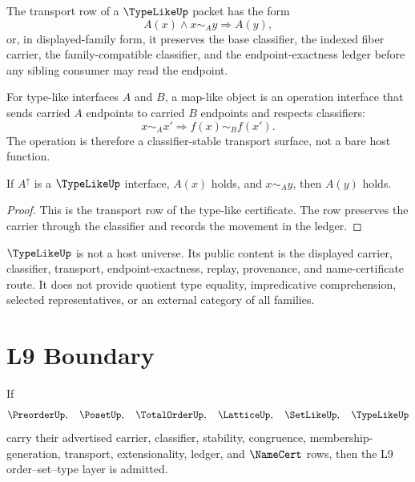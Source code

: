 \begin{definition}
\label{def:order-set-type-typelike-transport}
The transport row of a $\TypeLikeUp$ packet has the form
$$
A(x)\wedge x\sim_A y\Longrightarrow A(y),
$$
or, in displayed-family form, it preserves the base classifier, the indexed
fiber carrier, the family-compatible classifier, and the endpoint-exactness
ledger before any sibling consumer may read the endpoint.
\end{definition}

\begin{definition}
\label{def:order-set-type-maplike}
For type-like interfaces $A$ and $B$, a map-like object is an operation
interface that sends carried $A$ endpoints to carried $B$ endpoints and
respects classifiers:
$$
x\sim_A x'\Longrightarrow f(x)\sim_B f(x').
$$
The operation is therefore a classifier-stable transport surface, not a bare
host function.
\end{definition}

\begin{theorem}
\label{thm:order-set-type-transport-core}
If $A^\uparrow$ is a $\TypeLikeUp$ interface, $A(x)$ holds, and
$x\sim_A y$, then $A(y)$ holds.
\end{theorem}

\begin{proof}
This is the transport row of the type-like certificate.  The row preserves
the carrier through the classifier and records the movement in the ledger.
\end{proof}

\begin{principle}
\label{prin:order-set-type-typelike-host-boundary}
$\TypeLikeUp$ is not a host universe.  Its public content is the displayed
carrier, classifier, transport, endpoint-exactness, replay, provenance, and
name-certificate route.  It does not provide quotient type equality,
impredicative comprehension, selected representatives, or an external
category of all families.
\end{principle}

\section{L9 Boundary}
\label{sec:order-set-type-boundary}

\begin{theorem}
\label{thm:order-set-type-admission}
If
$$
\PreorderUp,\quad
\PosetUp,\quad
\TotalOrderUp,\quad
\LatticeUp,\quad
\SetLikeUp,\quad
\TypeLikeUp
$$
carry their advertised carrier, classifier, stability, congruence,
membership-generation, transport, extensionality, ledger, and $\NameCert$
rows, then the L9 order--set--type layer is admitted.
\end{theorem}

